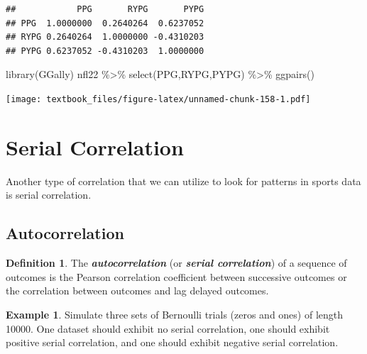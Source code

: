 \documentclass[
  11pt,
]{book}
\newenvironment{Shaded}{\begin{snugshade}}{\end{snugshade}}
\newcommand{\FunctionTok}[1]{\textcolor[rgb]{0.00,0.00,0.00}{#1}}
\newcommand{\NormalTok}[1]{#1}
\newcommand{\SpecialCharTok}[1]{\textcolor[rgb]{0.00,0.00,0.00}{#1}}
\theoremstyle{definition}
\newtheorem{definition}{Definition}[chapter]
\theoremstyle{definition}
\newtheorem{example}{Example}[chapter]
\theoremstyle{definition}
\theoremstyle{definition}
\theoremstyle{remark}
\begin{document}
\begin{verbatim}
##            PPG       RYPG       PYPG
## PPG  1.0000000  0.2640264  0.6237052
## RYPG 0.2640264  1.0000000 -0.4310203
## PYPG 0.6237052 -0.4310203  1.0000000
\end{verbatim}

\begin{Shaded}
\begin{Highlighting}[]
\FunctionTok{library}\NormalTok{(GGally)}
\NormalTok{nfl22 }\SpecialCharTok{\%\textgreater{}\%} \FunctionTok{select}\NormalTok{(PPG,RYPG,PYPG) }\SpecialCharTok{\%\textgreater{}\%} \FunctionTok{ggpairs}\NormalTok{()}
\end{Highlighting}
\end{Shaded}

\texttt{[image: textbook\_files/figure-latex/unnamed-chunk-158-1.pdf]}

\newpage

\hypertarget{serial-correlation}{%
\section{Serial Correlation}\label{serial-correlation}}

Another type of correlation that we can utilize to look for patterns in sports data is serial correlation.

\hypertarget{autocorrelation}{%
\subsection{Autocorrelation}\label{autocorrelation}}

\begin{definition}
The \textbf{\emph{autocorrelation}} (or \textbf{\emph{serial correlation}}) of a sequence of outcomes is the Pearson correlation coefficient between successive outcomes or the correlation between outcomes and lag delayed outcomes.
\end{definition}

\begin{example}
Simulate three sets of Bernoulli trials (zeros and ones) of length 10000. One dataset should exhibit no serial correlation, one should exhibit positive serial correlation, and one should exhibit negative serial correlation.
\end{example}
\end{document}
